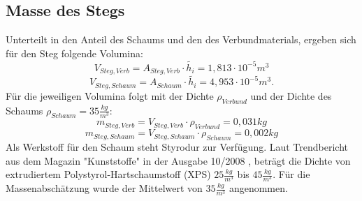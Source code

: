 \subsection{Masse des Stegs}
Unterteilt in den Anteil des Schaums und den des Verbundmaterials, ergeben sich für den Steg folgende Volumina:
\begin{equation}
	V_{Steg,Verb}=A_{Steg,Verb}\cdot\tilde{h_{i}}=1,813\cdot10^{-5}m^{3}
\end{equation}
\begin{equation}
	V_{Steg,Schaum}=A_{Schaum}\cdot\tilde{h_{i}}=4,953\cdot10^{-5}m^{3}.
\end{equation}
Für die jeweiligen Volumina folgt mit der Dichte $ \rho_{Verbund} $ und der Dichte des Schaums $ \rho_{Schaum}=35\frac{kg}{m^{3}} $:
\begin{equation}
	m_{Steg,Verb}=V_{Steg,Verb}\cdot\rho_{Verbund}=0,031kg
\end{equation}
\begin{equation}
		m_{Steg,Schaum}=V_{Steg,Schaum}\cdot\rho_{Schaum}=0,002kg
\end{equation}
Als Werkstoff für den Schaum steht Styrodur zur Verfügung. Laut Trendbericht aus dem Magazin "Kunststoffe" in der Ausgabe 10/2008 \cite{item7}, beträgt die Dichte von extrudiertem Polystyrol-Hartschaumstoff (XPS) $ 25\frac{kg}{m^{3}} $ bis $ 45\frac{kg}{m^{3}} $. Für die Massenabschätzung wurde der Mittelwert von $ 35\frac{kg}{m^{3}} $ angenommen.

